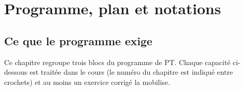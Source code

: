\chapter*{Programme, plan et notations}

\section*{Ce que le programme exige}

Ce chapitre regroupe trois blocs du programme de PT. Chaque capacité ci-dessous est traitée dans le cours (le numéro du chapitre est indiqué entre crochets) et au moins un exercice corrigé la mobilise.

